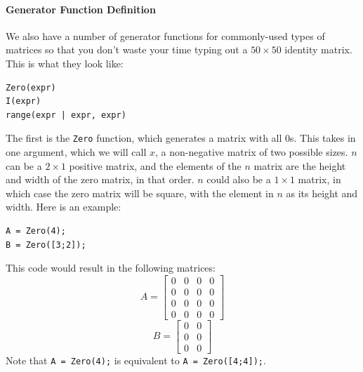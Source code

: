 \paragraph{Generator Function Definition}
We also have a number of generator functions for commonly-used types of matrices so that you don't waste your time typing out a $50 \times 50$ identity matrix.
This is what they look like:
\begin{lstlisting}
Zero(expr)
I(expr)
range(expr | expr, expr)
\end{lstlisting}

The first is the \verb=Zero= function, which generates a matrix with all 0s.  This takes in one argument, which we will call $x$, a non-negative matrix of two possible sizes.  $n$ can be a $2 \times 1$  positive matrix, and the elements of the $n$ matrix are the height and width of the zero matrix, in that order.  $n$ could also be a $1\times 1$ matrix, in which case the zero matrix will be square, with the element in $n$ as its height and width.  Here is an example:

\begin{lstlisting}
A = Zero(4);
B = Zero([3;2]);
\end{lstlisting}
This code would result in the following matrices:
$$A=\begin{bmatrix}0&0&0&0\\0&0&0&0\\0&0&0&0\\0&0&0&0\end{bmatrix}$$
$$B=\begin{bmatrix}0&0\\0&0\\0&0\end{bmatrix}$$
Note that \verb|A = Zero(4);| is equivalent to \verb|A = Zero([4;4]);|.

